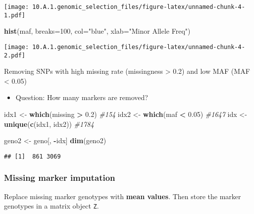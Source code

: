 \documentclass[
]{article}
\newenvironment{Shaded}{\begin{snugshade}}{\end{snugshade}}
\newcommand{\AttributeTok}[1]{\textcolor[rgb]{0.13,0.29,0.53}{#1}}
\newcommand{\CommentTok}[1]{\textcolor[rgb]{0.56,0.35,0.01}{\textit{#1}}}
\newcommand{\DecValTok}[1]{\textcolor[rgb]{0.00,0.00,0.81}{#1}}
\newcommand{\FloatTok}[1]{\textcolor[rgb]{0.00,0.00,0.81}{#1}}
\newcommand{\FunctionTok}[1]{\textcolor[rgb]{0.13,0.29,0.53}{\textbf{#1}}}
\newcommand{\NormalTok}[1]{#1}
\newcommand{\OtherTok}[1]{\textcolor[rgb]{0.56,0.35,0.01}{#1}}
\newcommand{\SpecialCharTok}[1]{\textcolor[rgb]{0.81,0.36,0.00}{\textbf{#1}}}
\newcommand{\StringTok}[1]{\textcolor[rgb]{0.31,0.60,0.02}{#1}}
\providecommand{\tightlist}{%
  \setlength{\itemsep}{0pt}\setlength{\parskip}{0pt}}
\begin{document}
\texttt{[image: 10.A.1.genomic\_selection\_files/figure-latex/unnamed-chunk-4-1.pdf]}

\begin{Shaded}
\begin{Highlighting}[]
\FunctionTok{hist}\NormalTok{(maf, }\AttributeTok{breaks=}\DecValTok{100}\NormalTok{, }\AttributeTok{col=}\StringTok{"blue"}\NormalTok{, }\AttributeTok{xlab=}\StringTok{"Minor Allele Freq"}\NormalTok{)}
\end{Highlighting}
\end{Shaded}

\texttt{[image: 10.A.1.genomic\_selection\_files/figure-latex/unnamed-chunk-4-2.pdf]}

Removing SNPs with high missing rate (missingness \textgreater{} 0.2)
and low MAF (MAF \textless{} 0.05)

\begin{itemize}
\tightlist
\item
  Question: How many markers are removed?
\end{itemize}

\begin{Shaded}
\begin{Highlighting}[]
\NormalTok{idx1 }\OtherTok{\textless{}{-}} \FunctionTok{which}\NormalTok{(missing }\SpecialCharTok{\textgreater{}} \FloatTok{0.2}\NormalTok{) }\CommentTok{\#154}
\NormalTok{idx2 }\OtherTok{\textless{}{-}} \FunctionTok{which}\NormalTok{(maf }\SpecialCharTok{\textless{}} \FloatTok{0.05}\NormalTok{) }\CommentTok{\#1647}
\NormalTok{idx }\OtherTok{\textless{}{-}} \FunctionTok{unique}\NormalTok{(}\FunctionTok{c}\NormalTok{(idx1, idx2)) }\CommentTok{\#1784}

\NormalTok{geno2 }\OtherTok{\textless{}{-}}\NormalTok{ geno[, }\SpecialCharTok{{-}}\NormalTok{idx]}
\FunctionTok{dim}\NormalTok{(geno2)}
\end{Highlighting}
\end{Shaded}

\begin{verbatim}
## [1]  861 3069
\end{verbatim}

\subsubsection{Missing marker
imputation}\label{missing-marker-imputation}

Replace missing marker genotypes with \textbf{mean values}. Then store
the marker genotypes in a matrix object \texttt{Z}.
\end{document}
